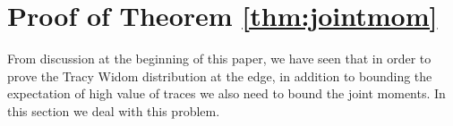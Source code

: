 \documentclass[12pt]{article}
\numberwithin{equation}{section}
\numberwithin{equation}{section}
\theoremstyle{definition}
\DeclareMathOperator{\E}{E} \DeclareMathOperator{\var}{Var}
\DeclareMathOperator{\Tr}{Tr}
\renewcommand{\1}{\bf 1}
\begin{document}
\section{Proof of Theorem \ref{thm:jointmom}}
From discussion at the beginning of this paper, we have seen that in order to prove the Tracy Widom distribution at the edge, in addition to bounding the expectation of high value of traces we also need to bound the joint moments. In this section we deal with this problem. 
\end{document}
